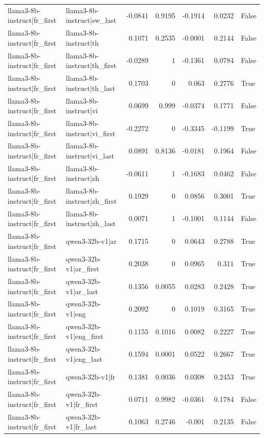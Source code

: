 \begin{table}
\begin{tabular}{l l r r r r l}
llama3-8b-instruct|fr_first & llama3-8b-instruct|sw_last & -0.0841 & 0.9195 & -0.1914 & 0.0232 & False \\
llama3-8b-instruct|fr_first & llama3-8b-instruct|th & 0.1071 & 0.2535 & -0.0001 & 0.2144 & False \\
llama3-8b-instruct|fr_first & llama3-8b-instruct|th_first & -0.0289 & 1 & -0.1361 & 0.0784 & False \\
llama3-8b-instruct|fr_first & llama3-8b-instruct|th_last & 0.1703 & 0 & 0.063 & 0.2776 & True \\
llama3-8b-instruct|fr_first & llama3-8b-instruct|vi & 0.0699 & 0.999 & -0.0374 & 0.1771 & False \\
llama3-8b-instruct|fr_first & llama3-8b-instruct|vi_first & -0.2272 & 0 & -0.3345 & -0.1199 & True \\
llama3-8b-instruct|fr_first & llama3-8b-instruct|vi_last & 0.0891 & 0.8136 & -0.0181 & 0.1964 & False \\
llama3-8b-instruct|fr_first & llama3-8b-instruct|zh & -0.0611 & 1 & -0.1683 & 0.0462 & False \\
llama3-8b-instruct|fr_first & llama3-8b-instruct|zh_first & 0.1929 & 0 & 0.0856 & 0.3001 & True \\
llama3-8b-instruct|fr_first & llama3-8b-instruct|zh_last & 0.0071 & 1 & -0.1001 & 0.1144 & False \\
llama3-8b-instruct|fr_first & qwen3-32b-v1|ar & 0.1715 & 0 & 0.0643 & 0.2788 & True \\
llama3-8b-instruct|fr_first & qwen3-32b-v1|ar_first & 0.2038 & 0 & 0.0965 & 0.311 & True \\
llama3-8b-instruct|fr_first & qwen3-32b-v1|ar_last & 0.1356 & 0.0055 & 0.0283 & 0.2428 & True \\
llama3-8b-instruct|fr_first & qwen3-32b-v1|eng & 0.2092 & 0 & 0.1019 & 0.3165 & True \\
llama3-8b-instruct|fr_first & qwen3-32b-v1|eng_first & 0.1155 & 0.1016 & 0.0082 & 0.2227 & True \\
llama3-8b-instruct|fr_first & qwen3-32b-v1|eng_last & 0.1594 & 0.0001 & 0.0522 & 0.2667 & True \\
llama3-8b-instruct|fr_first & qwen3-32b-v1|fr & 0.1381 & 0.0036 & 0.0308 & 0.2453 & True \\
llama3-8b-instruct|fr_first & qwen3-32b-v1|fr_first & 0.0711 & 0.9982 & -0.0361 & 0.1784 & False \\
llama3-8b-instruct|fr_first & qwen3-32b-v1|fr_last & 0.1063 & 0.2746 & -0.001 & 0.2135 & False \\

\end{tabular}
\end{table}

